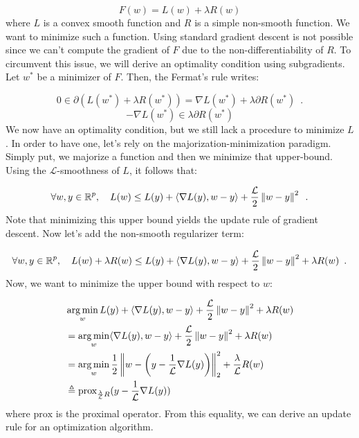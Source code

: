 \documentclass[a4paper,10pt]{article}
\theoremstyle{definition}
\begin{document}
\begin{equation*}
    F(w) = L(w) + \lambda R(w)
\end{equation*}
%
where $L$ is a convex smooth function and $R$ is a simple non-smooth function. We want to
minimize such a function. Using standard gradient descent is not possible since we can't compute the
gradient of $F$ due to the non-differentiability of $R$. To circumvent this issue, we will derive an
optimality condition using subgradients. Let $w^*$ be a minimizer of $F$. Then, the Fermat's rule
writes:

\begin{equation*}
    0 \in \partial 
    \left(
        L(w^*) + \lambda R(w^*)
    \right) 
    = \nabla L(w^*) + \lambda \partial R(w^*)
    \enspace .
\end{equation*}
%
\begin{equation*}
    - \nabla L(w^*) \in \lambda \partial R(w^*)
\end{equation*}
%
We now have an optimality condition, but we still lack a procedure to minimize $L$. 
In order to have one, let's rely on the majorization-minimization paradigm. Simply put, 
we majorize a function and then we minimize that upper-bound. Using the $\mathcal{L}$-smoothness
of $L$, it follows that:

\begin{equation*}
    \forall w, y \in \mathbb{R}^p,
    \quad
    L(w) \leq L(y) + 
    \langle
        \nabla L(y),
        w-y
    \rangle +
    \frac{\mathcal{L}}{2} 
    \left \lVert w - y \right \rVert^2
    \enspace .
\end{equation*}
%
Note that minimizing this upper bound yields the update rule of gradient descent. Now let's add
the non-smooth regularizer term:

\begin{equation*}
    \forall w, y \in \mathbb{R}^p,
    \quad
    L(w) + \lambda R(w) \leq L(y) + 
    \langle
        \nabla L(y),
        w-y
    \rangle +
    \frac{\mathcal{L}}{2} 
    \left \lVert w - y \right \rVert^2 
    + \lambda R(w) 
    \enspace .
\end{equation*}
%
Now, we want to minimize the upper bound with respect to $w$:

\begin{align*}
    &\operatorname*{arg\,min}_{w} L(y) + 
    \langle
        \nabla L(y),
        w-y
    \rangle +
    \frac{\mathcal{L}}{2} 
    \left \lVert w - y \right \rVert^2 
    + \lambda R(w) \\
    &= \operatorname*{arg\,min}_{w}
    \langle
        \nabla L(y),
        w-y
    \rangle +
    \frac{\mathcal{L}}{2} 
    \left \lVert w - y \right \rVert^2 
    + \lambda R(w) \\
    &= \operatorname*{arg\,min}_{w}
    \frac{1}{2}
    \left \lVert 
        w - \left(
            y - \frac{1}{\mathcal{L}}\nabla L(y)
        \right)
     \right \rVert^2_2 
    + \frac{\lambda}{\mathcal{L}}R(w) \\
    &\triangleq \text{prox}_{\frac{\lambda}{\mathcal{L}}R}
    (y - \frac{1}{\mathcal{L}}\nabla L(y))
\end{align*}
%
where $\text{prox}$ is the proximal operator. From this equality, we can derive an update
rule for an optimization algorithm.
\end{document}
